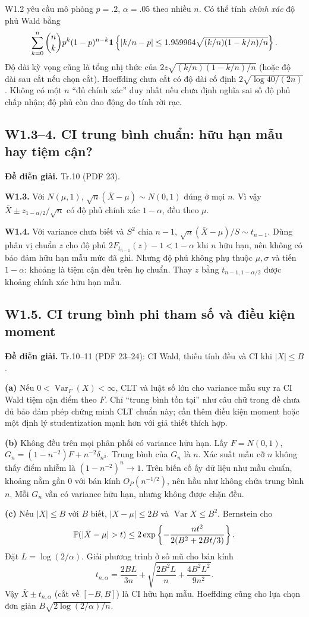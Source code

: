 \documentclass[11pt,a4paper]{article}
\DeclareMathOperator{\Var}{Var}\DeclareMathOperator{\Cov}{Cov}
\newcommand{\supp}[3]{\subsection{#1. #2}\label{s:#1}\textbf{Đề diễn giải.} #3\par}
\begin{document}
W1.2 yêu cầu mô phỏng $p=.2$, $\alpha=.05$ theo nhiều $n$. Có thể tính \emph{chính xác} độ phủ Wald bằng
\[
\sum_{k=0}^n\binom nk p^k(1-p)^{n-k}
\mathbf 1\left\{|k/n-p|\le1.959964\sqrt{(k/n)(1-k/n)/n}\right\}.
\]
Độ dài kỳ vọng cũng là tổng nhị thức của $2z\sqrt{(k/n)(1-k/n)/n}$ (hoặc độ dài sau cắt nếu chọn cắt). Hoeffding chưa cắt có độ dài cố định $2\sqrt{\log40/(2n)}$. Không có một $n$ ``đủ chính xác'' duy nhất nếu chưa định nghĩa sai số độ phủ chấp nhận; độ phủ còn dao động do tính rời rạc.

\supp{W1.3--4}{CI trung bình chuẩn: hữu hạn mẫu hay tiệm cận?}{Tr.10 (PDF 23).}
\textbf{W1.3.} Với $N(\mu,1)$, $\sqrt n(\bar X-\mu)\sim N(0,1)$ đúng ở mọi $n$. Vì vậy $\bar X\pm z_{1-\alpha/2}/\sqrt n$ có độ phủ chính xác $1-\alpha$, đều theo $\mu$.

\textbf{W1.4.} Với variance chưa biết và $S^2$ chia $n-1$,
$\sqrt n(\bar X-\mu)/S\sim t_{n-1}$. Dùng phân vị chuẩn $z$ cho độ phủ $2F_{t_{n-1}}(z)-1<1-\alpha$ khi $n$ hữu hạn, nên không có bảo đảm hữu hạn mẫu mức đã ghi. Nhưng độ phủ không phụ thuộc $\mu,\sigma$ và tiến $1-\alpha$: khoảng là tiệm cận đều trên họ chuẩn. Thay $z$ bằng $t_{n-1,1-\alpha/2}$ được khoảng chính xác hữu hạn mẫu.

\supp{W1.5}{CI trung bình phi tham số và điều kiện moment}{Tr.10--11 (PDF 23--24): CI Wald, thiếu tính đều và CI khi $|X|\le B$.}
\textbf{(a)} Nếu $0<\Var_F(X)<\infty$, CLT và luật số lớn cho variance mẫu suy ra CI Wald tiệm cận điểm theo $F$. Chỉ ``trung bình tồn tại'' như câu chữ trong đề chưa đủ bảo đảm phép chứng minh CLT chuẩn này; cần thêm điều kiện moment hoặc một định lý studentization mạnh hơn với giả thiết thích hợp.

\textbf{(b)} Không đều trên mọi phân phối có variance hữu hạn. Lấy $F=N(0,1)$,
$G_n=(1-n^{-2})F+n^{-2}\delta_{n^3}$. Trung bình của $G_n$ là $n$. Xác suất mẫu cỡ $n$ không thấy điểm nhiễm là $(1-n^{-2})^n\to1$. Trên biến cố ấy dữ liệu như mẫu chuẩn, khoảng nằm gần 0 với bán kính $O_P(n^{-1/2})$, nên hầu như không chứa trung bình $n$. Mỗi $G_n$ vẫn có variance hữu hạn, nhưng không được chặn đều.

\textbf{(c)} Nếu $|X|\le B$ với $B$ biết, $|X-\mu|\le2B$ và $\Var X\le B^2$. Bernstein cho
\[
\Pp(|\bar X-\mu|>t)\le2\exp\left\{-\frac{nt^2}{2(B^2+2Bt/3)}\right\}.
\]
Đặt $L=\log(2/\alpha)$. Giải phương trình ở số mũ cho bán kính
\[
t_{n,\alpha}=\frac{2BL}{3n}+\sqrt{\frac{2B^2L}{n}+\frac{4B^2L^2}{9n^2}}.
\]
Vậy $\bar X\pm t_{n,\alpha}$ (cắt về $[-B,B]$) là CI hữu hạn mẫu. Hoeffding cũng cho lựa chọn đơn giản $B\sqrt{2\log(2/\alpha)/n}$.
\end{document}
